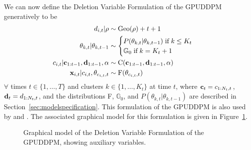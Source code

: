 \documentclass{article}
\begin{document}
We can now define the Deletion Variable Formulation of the GPUDDPM generatively to be
\begin{align}
\begin{split}
d_{i,t} | \rho  &\sim \text{Geo}(\rho) + t + 1 \\
\theta_{k, t} | \theta_{k, t-1}  &\sim
\begin{cases}
P(\theta_{k,t} | \theta_{k,t-1}) \hspace{1mm} \text{if} \hspace{1mm} k \leq K_{t} \\ %
\mathbb{G}_{0} \hspace{1mm} \text{if} \hspace{1mm} k = K_{t} + 1
\end{cases} \\
c_{i,t} | \bold{c}_{1:t-1}, \bold{d}_{1:t-1}, \alpha  &\sim  \text{C}(\bold{c}_{1:t-1}, \bold{d}_{1:t-1}, \alpha) \\
\bold{x}_{i,t} | c_{i,t}, \theta_{c_{i,t},t}  &\sim  \text{F}(\theta_{c_{i,t}, t})
\end{split}
\end{align}
$\forall$ times $t \in \{1, \ldots, T\}$ and clusters $k \in \{ 1, \ldots, K_{t} \} $ at time $t$,
where $\bold{c}_{t} = c_{1:N_{t},t}$, $\bold{d}_{t} = d_{1:N_{t},t}$, and the distributions F, $\mathbb{G}_{0}$, and $P(\theta_{k, t} | \theta_{k, t-1})$ are described in Section~\ref{sec:modelspecification}. This formulation of the GPUDDPM is also used by \cite{gasthaus_thesis} and \cite{caron_2007}. The associated graphical model for this formulation is given in Figure~\ref{fig:gpuddpm_gm_2}.
\begin{figure}[h]
        \caption{Graphical model of the Deletion Variable Formulation of the GPUDDPM, showing auxiliary variables.}
        \label{fig:gpuddpm_gm_2}
\end{figure}
\end{document}
